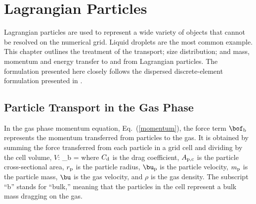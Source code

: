 

\chapter{Lagrangian Particles}
\label{chapter:lagrangian_particles}

Lagrangian particles are used to represent a wide variety of objects that cannot be resolved on
the numerical grid. Liquid droplets are the most common example. This chapter outlines the treatment of the transport; size
distribution; and mass, momentum and energy transfer to and from Lagrangian particles.  The formulation presented here closely follows the dispersed discrete-element formulation presented in \cite{Crowe:1}.

\section{Particle Transport in the Gas Phase}

In the gas phase momentum equation, Eq.~(\ref{momentum}), the force term $\bof_{\rm b}$ represents the momentum transferred from particles to the gas. It is obtained by summing the force transferred from each particle in a grid cell and dividing by the cell volume, $V$:
\be
    {\bof_{\rm b}} =  \sum  {} \label{part_force}
\ee
where $C_{\rm d}$ is the drag coefficient, $A_{\rm p,c}$ is the particle cross-sectional area, $r_{\rm p}$ is the particle radius, $\bu_{\rm p}$ is the particle velocity, $m_{\rm p}$ is the particle mass, $\bu$ is the gas velocity, and $\rho$ is the gas density. The subscript ``b'' stands for ``bulk,'' meaning that the particles in the cell represent a bulk mass dragging on the gas.

